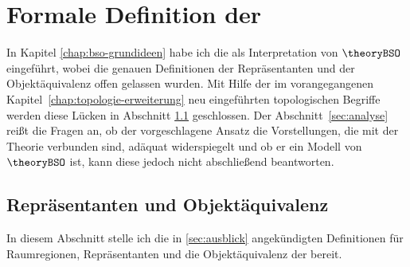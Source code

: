 \chapter{Formale Definition der \strukt}\label{chap:bso-struktur}
    In Kapitel \ref{chap:bso-grundideen} habe ich die \strukt als Interpretation von $\theoryBSO$ eingeführt, wobei die genauen Definitionen der Repräsentanten und der Objektäquivalenz offen gelassen wurden. 
    Mit Hilfe der im vorangegangenen Kapitel~\ref{chap:topologie-erweiterung} neu eingeführten topologischen Begriffe werden diese Lücken in Abschnitt \ref{sec:univ-2} geschlossen.
    Der Abschnitt~\ref{sec:analyse} reißt die Fragen an, ob der vorgeschlagene Ansatz die Vorstellungen, die mit der Theorie verbunden sind, adäquat widerspiegelt und ob er ein Modell von $\theoryBSO$ ist, kann diese jedoch nicht abschließend beantworten.
% 


    \section{Repräsentanten und Objektäquivalenz}\label{sec:univ-2}
    In diesem Abschnitt stelle ich die in \ref{sec:ausblick} angekündigten Definitionen für Raumregionen, Repräsentanten und die Objektäquivalenz der \strukt bereit.

